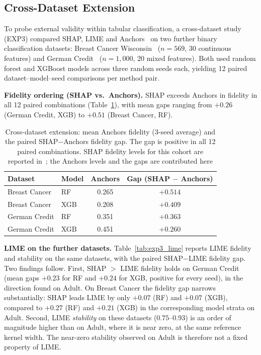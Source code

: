 \documentclass{cleiej}
\begin{document}
\subsection{Cross-Dataset Extension}
\label{sec:exp3}

To probe external validity within tabular classification, a cross-dataset
study (EXP3) compared SHAP, LIME and Anchors~\cite{ribeiro2018anchors} on
two further binary classification datasets: Breast Cancer
Wisconsin~\cite{dua2019uci,wolberg1993breast} ($n=569$, 30 continuous
features) and German Credit~\cite{dua2019uci,hofmann1994statlog}
($n=1{,}000$, 20 mixed features). Both used random forest and XGBoost
models across three random seeds each, yielding 12 paired
dataset--model--seed comparisons per method pair.

\textbf{Fidelity ordering (SHAP vs.\ Anchors).} SHAP exceeds Anchors in
fidelity in all 12 paired combinations (Table~\ref{tab:exp3_fidelity}),
with mean gaps ranging from $+0.26$ (German Credit, XGB) to $+0.51$ (Breast
Cancer, RF).

\begin{table}[htb]
\centering
\caption{Cross-dataset extension: mean Anchors fidelity (3-seed average)
and the paired SHAP$-$Anchors fidelity gap. The gap is positive in all 12
paired combinations. SHAP fidelity levels for this cohort are reported
in~\cite{herrera2026framework}; the Anchors levels and the gaps are
contributed here}
\label{tab:exp3_fidelity}
\begin{tabular}{llcc}
\toprule
Dataset        & Model & Anchors & Gap (SHAP $-$ Anchors) \\
\midrule
Breast Cancer  & RF    & 0.265   & $+0.514$ \\
Breast Cancer  & XGB   & 0.208   & $+0.409$ \\
German Credit  & RF    & 0.351   & $+0.363$ \\
German Credit  & XGB   & 0.451   & $+0.260$ \\
\bottomrule
\end{tabular}
\end{table}

\textbf{LIME on the further datasets.} Table~\ref{tab:exp3_lime} reports
LIME fidelity and stability on the same datasets, with the paired
SHAP$-$LIME fidelity gap. Two findings follow.
First, SHAP $>$ LIME fidelity holds on German Credit (mean gaps $+0.23$ for
RF and $+0.24$ for XGB, positive for every seed), in the direction found on
Adult. On Breast Cancer the fidelity gap narrows substantially: SHAP leads
LIME by only $+0.07$ (RF) and $+0.07$ (XGB), compared to $+0.27$ (RF) and
$+0.21$ (XGB) in the corresponding model strata on Adult. Second, LIME
\emph{stability} on these datasets ($0.75$--$0.93$) is an order of
magnitude higher than on Adult, where it is near zero, at the same
reference kernel width. The near-zero stability observed on Adult is
therefore not a fixed property of LIME.
\end{document}
